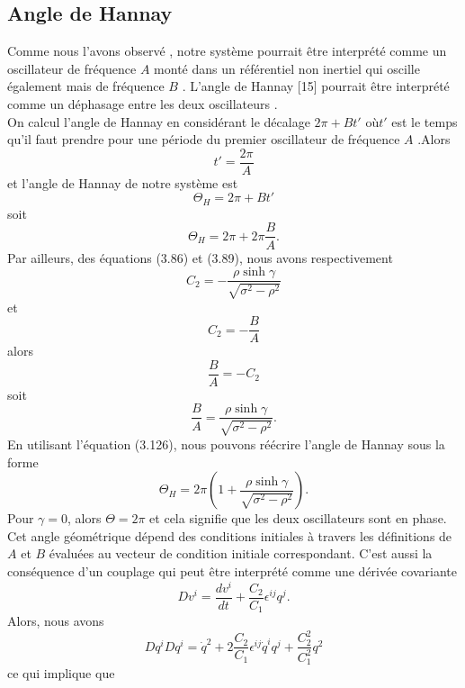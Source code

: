 \documentclass[12pt,a4paper, openany]{report}
\begin{document}
\subsection{Angle de Hannay}
Comme nous l'avons observé , notre système pourrait \^{e}tre interprété comme un oscillateur de fréquence $A$ monté dans un référentiel non inertiel qui oscille également mais de fréquence $B$ . L'angle de Hannay [15] pourrait \^{e}tre interprété comme un déphasage entre les deux 
oscillateurs .\\ On calcul l'angle de Hannay en considérant le décalage $2\pi+Bt'$ où$ t'$ est le temps qu'il  faut prendre  pour une période du premier oscillateur de fréquence $A$ .Alors 
\begin{equation}
	t'=\frac{2\pi}{A}
\end{equation}
et l'angle de Hannay de notre système est 
\begin{equation}
	\varTheta_H=2\pi+Bt'
\end{equation}
soit 
\begin{equation}
	\varTheta_H=2\pi+2\pi\frac{B}{A}.	
\end{equation}
Par ailleurs, des équations (3.86) et (3.89), nous avons respectivement
$$ C_2=-\frac{\rho\sinh{\gamma}}{\sqrt{\sigma^2-\rho^2}}$$
et \\
$$C_2=-\frac{B}{A}$$
alors 
\begin{equation}
	\frac{B}{A}= -C_2
\end{equation} soit
\begin{equation}
	\frac{B}{A}=\frac{\rho\sinh{\gamma}}{\sqrt{\sigma^2-\rho^2}}. 
\end{equation} En utilisant l'équation (3.126), nous pouvons réécrire l'angle de Hannay sous la forme 
\begin{equation}
	\varTheta_H=2\pi\left(1+\frac{\rho\sinh{\gamma}}{\sqrt{\sigma^2-\rho^2}}\right).	
\end{equation} Pour $\gamma=0$, alors $\varTheta=2\pi$ et cela signifie que les deux oscillateurs sont en phase. Cet angle géométrique dépend des conditions initiales à travers les définitions de $A$ et $B$ évaluées au vecteur de condition initiale correspondant. C'est aussi la conséquence d'un couplage qui peut \^{e}tre interprété comme une dérivée covariante 
\begin{equation}
	Dv^i=\frac{dv^i}{dt}+\frac{C_2}{C_1}\epsilon^{ij}	q^j.
\end{equation}
Alors, nous avons 
\begin{equation}
	Dq^iDq^i=\dot{q}^2+2\frac{C_2}{C_1}\epsilon^{ij}\dot{q}^iq^j+\frac{C^2_2}{C^2_1}q^2	
\end{equation} ce qui implique que 
\end{document}
